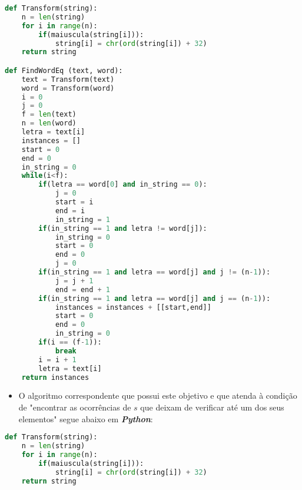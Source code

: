 \documentclass[paper=a4, fontsize=11pt]{scrartcl} %
\numberwithin{equation}{section} %
\numberwithin{figure}{section} %
\numberwithin{table}{section} %
\begin{document}
\begin{lstlisting}[language=Python, caption=String Python Algorithm]
def Transform(string):
    n = len(string)
    for i in range(n):
        if(maiuscula(string[i])):
            string[i] = chr(ord(string[i]) + 32)
    return string

def FindWordEq (text, word):
    text = Transform(text)
    word = Transform(word)
    i = 0
    j = 0
    f = len(text)
    n = len(word)
    letra = text[i]
    instances = []
    start = 0
    end = 0
    in_string = 0
    while(i<f):
        if(letra == word[0] and in_string == 0):
            j = 0
            start = i
            end = i
            in_string = 1
        if(in_string == 1 and letra != word[j]):
            in_string = 0
            start = 0
            end = 0
            j = 0            
        if(in_string == 1 and letra == word[j] and j != (n-1)):
            j = j + 1
            end = end + 1   
        if(in_string == 1 and letra == word[j] and j == (n-1)):
            instances = instances + [[start,end]]
            start = 0
            end = 0
            in_string = 0
        if(i == (f-1)):
            break
        i = i + 1
        letra = text[i]
    return instances
\end{lstlisting}

\begin{itemize}
   \item O algoritmo correspondente que possui este objetivo e que atenda à condição de "encontrar as ocorrências de $s$ que deixam de verificar até um dos seus elementos" segue abaixo em \emph{\textbf{Python}}:
\end{itemize}

\begin{lstlisting}[language=Python, caption=String Python Algorithm]
def Transform(string):
    n = len(string)
    for i in range(n):
        if(maiuscula(string[i])):
            string[i] = chr(ord(string[i]) + 32)
    return string
\end{lstlisting}

\end{document}
